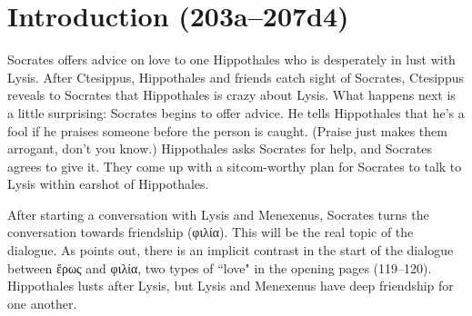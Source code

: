 \documentclass[11pt]{article}
\begin{document}
\section{Introduction (203a--207d4)}

Socrates offers advice on love to one Hippothales who is desperately in lust with Lysis.  After Ctesippus, Hippothales and friends catch sight of Socrates, Ctesippus reveals to Socrates that Hippothales is crazy about Lysis.  What happens next is a little surprising: Socrates begins to offer advice.  He tells Hippothales that he's a fool if he praises someone before the person is caught.  (Praise just makes them arrogant, don't you know.)  Hippothales asks Socrates for help, and Socrates agrees to give it.  They come up with a sitcom-worthy plan for Socrates to talk to Lysis within earshot of Hippothales.

After starting a conversation with Lysis and Menexenus, Socrates turns the conversation towards friendship (φιλία).  This will be the real topic of the dialogue.  As \citet{watt1987} points out, there is an implicit contrast in the start of the dialogue between ἔρως and φιλία, two types of ``love" in the opening pages (119--120).  Hippothales lusts after Lysis, but Lysis and Menexenus have deep friendship for one another.

\newpage


\end{document}
